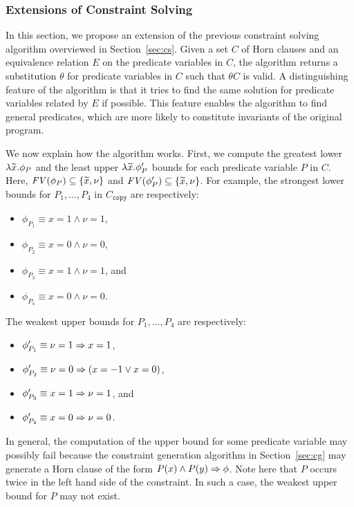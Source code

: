 \subsubsection{Extensions of Constraint Solving}
\label{sec:extcs}

In this section, we propose an extension of the previous constraint 
solving algorithm overviewed in Section~\ref{sec:cs}.  Given a set \(C\) 
of Horn clauses and an equivalence relation \(E\) on the predicate 
variables in \(C\), the algorithm returns a substitution \(\theta\) for 
predicate variables in \(C\) such that \(\theta C\) is valid.  A 
distinguishing feature of the algorithm is that it tries to find the 
same solution for predicate variables related by \(E\) if possible.  
This feature enables the algorithm to find general predicates, which are 
more likely to constitute invariants of the original program.

We now explain how the algorithm works.  First, we compute the greatest 
lower \(\lambda \widetilde{x}.\phi_P\) and the least upper \(\lambda 
\widetilde{x}.\phi_P'\) bounds for each predicate variable \(P\) in \(C\).  
Here, \(\mathit{FV}({\phi_P}) \subseteq\{{\widetilde{x},\nu}\}\) and \(\mathit{FV}({\phi_P'}) 
\subseteq \{{\widetilde{x},\nu}\}\).  For example, the strongest lower bounds 
for \(P_1,\dots,P_4\) in \(C_{\texttt{copy}}\) are respectively:
\begin{itemize}
\item \(\phi_{P_1}\equiv x=1 \land \nu=1\),
\item \(\phi_{P_2}\equiv x=0 \land \nu=0\),
\item \(\phi_{P_3}\equiv x=1 \land \nu=1\), and
\item \(\phi_{P_4}\equiv x=0 \land \nu=0\).
\end{itemize}
The weakest upper bounds for \(P_1,\dots,P_4\) are respectively:
\begin{itemize}
\item \(\phi_{P_1}'\equiv \nu=1 \Rightarrow x=1\),
\item \(\phi_{P_2}'\equiv \nu=0 \Rightarrow (x=-1 \lor x=0)\),
\item \(\phi_{P_3}'\equiv x=1 \Rightarrow \nu=1\), and
\item \(\phi_{P_4}'\equiv x=0 \Rightarrow \nu=0\).
\end{itemize}

In general, the computation of the upper bound for some predicate
variable may possibly fail because the constraint generation algorithm
in Section~\ref{sec:cg} may generate a Horn clause of the form \(P(x)
\land P(y) \Rightarrow \phi\).  Note here that \(P\) occurs twice in the left
hand side of the constraint.  In such a case, the weakest upper bound
for \(P\) may not exist.

